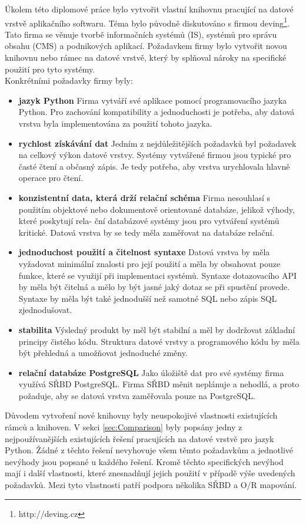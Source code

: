 \documentclass[ing,male,java,dept456]{diploma}						%
\begin{document}
Úkolem této diplomové práce bylo vytvořit vlastní knihovnu pracující na datové vrstvě aplikačního softwaru. Téma bylo původně diskutováno s firmou deving\footnote{http://deving.cz}. Tato firma se věnuje tvorbě informačních systémů (IS), systémů pro správu obsahu (CMS) a podnikových aplikací. Požadavkem firmy bylo vytvořit novou knihovnu nebo rámec na datové vrstvě, který by splňoval nároky na specifické použití pro tyto systémy. \\
Konkrétními požadavky firmy byly:
\begin{itemize}
\item \textbf{jazyk Python} Firma vytváří své aplikace pomocí programovacího jazyka Python. Pro zachování kompatibility a jednoduchosti je potřeba, aby datová vrstva byla implementována za použití tohoto jazyka.
\item \textbf{rychlost získávání dat} Jedním z nejdůležitějších požadavků byl požadavek na celkový výkon datové vrstvy. Systémy vytvářené firmou jsou typické pro časté čtení a občasný zápis. Je tedy potřeba, aby vrstva urychlovala hlavně operace pro čtení. 
\item \textbf{konzistentní data, která drží relační schéma} Firma nesouhlasí s použitím objektové nebo dokumentově orientované databáze, jelikož výhody, které poskytují rela- ční databázové systémy jsou pro vytváření systémů kritické. Datová vrstva by se tedy měla zaměřovat na databáze relační.
\item \textbf{jednoduchost použití a čitelnost syntaxe} Datová vrstva by měla vyžadovat minimální znalosti pro její použití a měla by obsahovat pouze funkce, které se využijí při implementaci systémů. Syntaxe dotazovacího API by měla být čitelná a mělo by být jasné jaký dotaz se při spustění provede. Syntaxe by měla být také jednodušší než samotné SQL nebo zápis SQL zjednodušovat.
\item \textbf{stabilita} Výsledný produkt by měl být stabilní a měl by dodržovat základní principy čistého kódu. Struktura datové vrstvy a programového kódu by měla být přehledná a umožňovat jednoduché změny.
\item \textbf{relační databáze PostgreSQL} Jako úložiště dat pro své systémy firma využívá SŘBD PostgreSQL. Firma SŘBD měnit neplánuje a nehodlá, a proto požaduje, aby se datová vrstva zaměřovala pouze na PostgreSQL.
\end{itemize}

Důvodem vytvoření nové knihovny byly neuspokojivé vlastnosti existujících rámců a knihoven. V sekci \ref{sec:Comparison} byly popsány jedny z nejpoužívanějších existujících řešení pracujících na datové vrstvě pro jazyk Python. Žádné z těchto řešení nevyhovuje všem těmto požadavkům a jednotlivé nevýhody jsou popsané u každého řešení. Kromě těchto specifických nevýhod mají i další vlastnosti, které znesnadňují jejich použití v případě výše uvedených požadavků. Mezi tyto vlastnosti patří podpora několika SŘBD a O/R mapování. 
\end{document}
